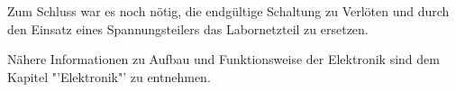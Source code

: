 \begin{itemize}
Zum Schluss war es noch nötig, die endgültige Schaltung zu Verlöten und durch den Einsatz eines Spannungsteilers das Labornetzteil zu ersetzen.
\end{itemize}

Nähere Informationen zu Aufbau und Funktionsweise der Elektronik sind dem Kapitel "'Elektronik"' zu entnehmen.